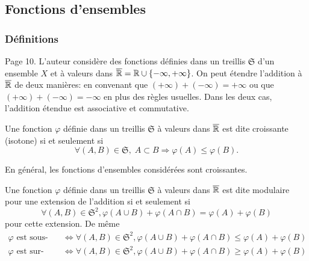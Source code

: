 \subsection{Fonctions d'ensembles}
\subsubsection{Définitions}
Page 10. L'auteur considère des fonctions définies dans un treillis $\mathfrak{S}$ d'un ensemble $X$ et à valeurs dans $\overline{\mathbb{R}}= \mathbb{R} \cup\{- \infty, + \infty\} $. On peut étendre l'addition à $\overline{\mathbb{R}}$ de deux manières: en convenant que $(+ \infty) + (-\infty) = + \infty$ ou que $(+ \infty) + (-\infty) = - \infty$ en plus des règles usuelles. Dans les deux cas, l'addition étendue est associative et commutative.
\begin{defi}
  Une fonction $\varphi$ définie dans un treillis $\mathfrak{S}$ à valeurs dans $\overline{\mathbb{R}}$ est dite croissante (isotone) si et seulement si
  \begin{displaymath}
    \forall (A,B) \in \mathfrak{S},\; A \subset B \Rightarrow \varphi(A) \leq \varphi(B).
  \end{displaymath}
\end{defi}
\noindent En général, les fonctions d'ensembles considérées sont croissantes.

\begin{defi}
  Une fonction $\varphi$ définie dans un treillis $\mathfrak{S}$ à valeurs dans $\overline{\mathbb{R}}$ est dite modulaire pour une extension de l'addition si et seulement si
\begin{displaymath}
  \forall (A,B) \in \mathfrak{S}^2, \varphi(A \cup B) + \varphi(A \cap B) = \varphi(A) + \varphi(B)
\end{displaymath}
pour cette extension. De même
\begin{align*}
  \varphi \text{ est sous-modulaire } &\Leftrightarrow \forall (A,B) \in \mathfrak{S}^2, \varphi(A \cup B) + \varphi(A \cap B) \leq \varphi(A) + \varphi(B) \\
  \varphi \text{ est sur-modulaire } &\Leftrightarrow \forall (A,B) \in \mathfrak{S}^2, \varphi(A \cup B) + \varphi(A \cap B) \geq \varphi(A) + \varphi(B)
\end{align*}
\end{defi}


